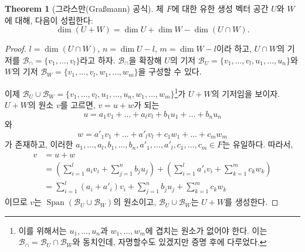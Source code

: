 \documentclass[unfonts,oneside,a4paper]{oblivoir}
\theoremstyle{definition}
\theoremstyle{theorem}
\newtheorem{theorem}{Theorem}
\theoremstyle{remark}
\theoremstyle{remark}
\theoremstyle{remark}
\theoremstyle{remark}
\renewcommand{\vec}[1]{\bm{\mathit{#1}}}
\DeclareMathOperator{\Span}{Span}
\begin{document}
\begin{theorem}[그라스만(Graßmann) 공식]
    체 $F$에 대한 유한 생성 벡터 공간 $U$와 $W$에 대해, 다음이 성립한다:
    \begin{equation*}
        \dim (U + W) = \dim U + \dim W - \dim (U \cap W).
    \end{equation*}
\end{theorem}

\begin{proof}
    $l = \dim (U \cap W)$, $n = \dim U - l$, $m = \dim W - l$이라 하고, $U \cap W$의 기저를 $\mathcal B_\cap = \{\vec v_1, \dots, \vec v_l\}$라고 하자.
    $\mathcal B_\cap$을 확장해 $U$의 기저 $\mathcal B_U = \{\vec v_1, \dots, \vec v_l, \vec u_1, \dots, \vec u_n\}$와 $W$의 기저 $\mathcal B_W = \{\vec v_1, \dots, \vec v_l, \vec w_1, \dots, \vec w_m\}$을 구성할 수 있다.

    이제 $\mathcal B_U \cup \mathcal B_W = \{\vec v_1, \dots, \vec v_l, \vec u_1, \dots, \vec u_n, \vec w_1, \dots, \vec w_m\}$\footnote{이를 위해서는 $\vec u_1, \dots, \vec u_n$과 $\vec w_1, \dots, \vec w_m$에 겹치는 원소가 없어야 한다.
    이는 $\mathcal B_\cap = \mathcal B_U \cap \mathcal B_W$와 동치인데, 자명할수도 있겠지만 증명 후에 다루었다.}가 $U + W$의 기저임을 보이자.
    $U + W$의 원소 $\vec v$를 고르면, $\vec v = \vec u + \vec w$가 되는
    \[
        \vec u = a_1 \vec v_1 + \dots + a_l \vec v_l + b_1 \vec u_1 + \dots + b_n \vec u_n
    \]
    와
    \[
        \vec w = a'_1 \vec v_1 + \dots + a'_l \vec v_l + c_1 \vec w_1 + \dots + c_m \vec w_m
    \]
    가 존재하고, 이러한 $a_1, \dots, a_l, b_1, \dots, b_n, a'_1, \dots, a'_l, c_1, \dots, c_m \in F$는 유일하다.
    따라서,
    \begin{align*}
        \vec v &= \vec u + \vec w\\
               &= \left(\sum_{i = 1}^l a_i \vec v_i + \sum_{j = 1}^n b_j \vec u_j\right) + \left(\sum_{i = 1}^l a'_i \vec v_i + \sum_{k = 1}^m c_k \vec w_k\right)\\
               &= \sum_{i = 1}^l \left(a_i + a'_i\right) \vec v_i + \sum_{j = 1}^n b_j \vec u_j + \sum_{k = 1}^m c_k \vec w_k
    \end{align*}
    이므로 $\vec v$는 $\Span (\mathcal B_U \cup \mathcal B_W)$의 원소이고, $\mathcal B_U \cup \mathcal B_W$는 $U + W$를 생성한다.


\end{proof}
\end{document}
